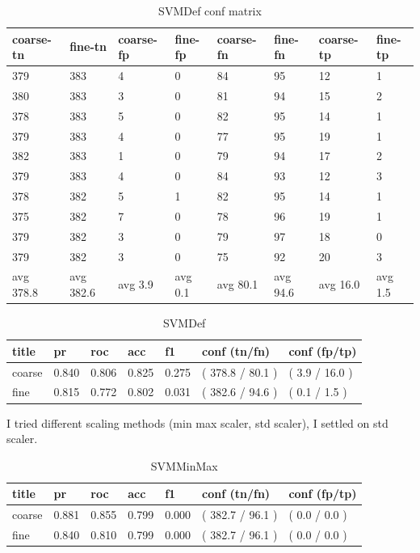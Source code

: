 \documentclass[ms]{nuthesis}
\begin{document}
\FloatBarrier
\begin{table}[H]
\centering
\begin{tabular}{|l||l||l||l||l||l||l||l|}\toprule
coarse-tn & fine-tn & coarse-fp & fine-fp & coarse-fn & fine-fn & coarse-tp & fine-tp \\ \midrule
379 & 383 & 4 & 0 & 84 & 95 & 12 & 1 \\
380 & 383 & 3 & 0 & 81 & 94 & 15 & 2 \\
378 & 383 & 5 & 0 & 82 & 95 & 14 & 1 \\
379 & 383 & 4 & 0 & 77 & 95 & 19 & 1 \\
382 & 383 & 1 & 0 & 79 & 94 & 17 & 2 \\
379 & 383 & 4 & 0 & 84 & 93 & 12 & 3 \\
378 & 382 & 5 & 1 & 82 & 95 & 14 & 1 \\
375 & 382 & 7 & 0 & 78 & 96 & 19 & 1 \\
379 & 382 & 3 & 0 & 79 & 97 & 18 & 0 \\
379 & 382 & 3 & 0 & 75 & 92 & 20 & 3 \\
avg 378.8 & avg 382.6 & avg 3.9 & avg 0.1 & avg 80.1 & avg 94.6 & avg 16.0 & avg 1.5 \\ \bottomrule
\end{tabular}
\caption{SVMDef conf matrix}
\label{tab:SVMDefConfMat}
\end{table}
\FloatBarrier


\FloatBarrier
\begin{table}[H]
\centering
\begin{tabular}{|l||l||l||l||l||l||l|}\toprule
title & pr & roc & acc & f1 & conf (tn/fn) & conf (fp/tp) \\ \midrule
coarse & 0.840 & 0.806 & 0.825 & 0.275 & ( 378.8 / 80.1 ) & ( 3.9 / 16.0 ) \\
fine & 0.815 & 0.772 & 0.802 & 0.031 & ( 382.6 / 94.6 ) & ( 0.1 / 1.5 ) \\ \bottomrule
\end{tabular}
\caption{SVMDef}
\label{tab:SVMDef}
\end{table}
\FloatBarrier




\par I tried different scaling methods (min max scaler, std scaler), I settled on std scaler.

\FloatBarrier
\begin{table}[H]
\centering
\begin{tabular}{|l||l||l||l||l||l||l|}\toprule
title & pr & roc & acc & f1 & conf (tn/fn) & conf (fp/tp) \\ \midrule
coarse & 0.881 & 0.855 & 0.799 & 0.000 & ( 382.7 / 96.1 ) & ( 0.0 / 0.0 ) \\
fine & 0.840 & 0.810 & 0.799 & 0.000 & ( 382.7 / 96.1 ) & ( 0.0 / 0.0 ) \\ \bottomrule
\end{tabular}
\caption{SVMMinMax}
\label{tab:SVMMinMax}
\end{table}
\FloatBarrier
\end{document}
